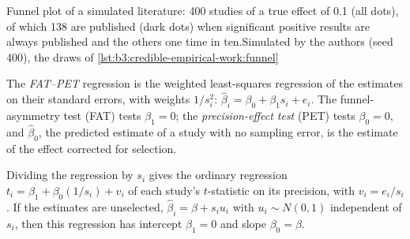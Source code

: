 \begin{omchart}{Funnel plot of a simulated literature: 400 studies of a true
effect of 0.1 (all dots), of which 138 are published (dark dots) when significant
positive results are always published and the others one time in ten.}{Simulated
by the authors (seed 400), the draws of
\cref{lst:b3:credible-empirical-work:funnel}}
\end{omchart}

\begin{definition}\label{def:b3:credible-empirical-work:fat-pet}
The \emph{FAT--PET} regression is the weighted least-squares regression of the
estimates on their standard errors, with weights $1/s_i^2$:
$\hat\beta_i = \beta_0 + \beta_1 s_i + e_i$. The funnel-asymmetry test (FAT)
tests $\beta_1 = 0$; the \emph{precision-effect test} (PET) tests $\beta_0 = 0$,
and $\hat\beta_0$, the predicted estimate of a study with no sampling error, is
the estimate of the effect corrected for selection.
\end{definition}

\begin{proposition}\label{prop:b3:credible-empirical-work:fatpet}
Dividing the  regression by $s_i$ gives the ordinary regression $t_i =
\beta_1 + \beta_0 (1/s_i) + v_i$ of each study's $t$-statistic on its precision,
with $v_i = e_i/s_i$. If the estimates are unselected, $\hat\beta_i = \beta + s_i
u_i$ with $u_i \sim N(0, 1)$ independent of $s_i$, then this regression has
intercept $\beta_1 = 0$ and slope $\beta_0 = \beta$.
\end{proposition}

